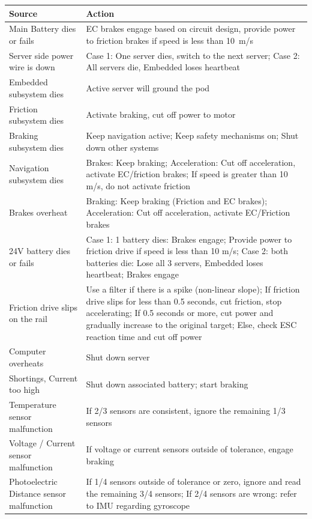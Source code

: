 \begin{table}[p]
\centering
\begin{tabular}{@{}p{3cm}p{13cm}@{}}
\toprule 
 Source & Action\\
\midrule
Main Battery dies or fails & EC brakes engage based on circuit design, provide power to friction brakes if speed is less than \SI{10}{m/s}\\
Server side power wire is down& Case 1: One server dies, switch to the next server; Case 2: All servers die, Embedded loses heartbeat\\
Embedded subsystem dies& Active server will ground the pod\\
Friction subsystem dies& Activate braking, cut off power to motor\\
Braking subsystem dies& Keep navigation active; Keep safety mechanisms on; Shut down other systems\\
Navigation subsystem dies& Brakes: Keep braking; Acceleration: Cut off acceleration, activate EC/friction brakes; If speed is greater than 10 m/s, do not activate friction\\
Brakes overheat& Braking: Keep braking (Friction and EC brakes); Acceleration: Cut off acceleration, activate EC/Friction brakes\\
24V battery dies or fails&Case 1: 1 battery dies: Brakes engage; Provide power to friction drive if speed is less than 10 m/s; Case 2: both batteries die:  Lose all 3 servers, Embedded loses heartbeat; Brakes engage\\
Friction drive slips on the rail&Use a filter if there is a spike (non-linear slope); If friction drive slips for less than 0.5 seconds, cut friction, stop accelerating; If 0.5 seconds or more, cut power and gradually increase to the original target; Else, check ESC reaction time and cut off power\\
Computer overheats & Shut down server\\
Shortings, Current too high & Shut down associated battery; start braking\\
Temperature sensor malfunction & If 2/3 sensors are consistent, ignore the remaining 1/3 sensors\\
Voltage / Current sensor malfunction& If voltage or current sensors outside of tolerance, engage braking\\
Photoelectric Distance sensor malfunction& If 1/4 sensors outside of tolerance or zero, ignore and read the remaining 3/4 sensors; If 2/4 sensors are wrong: refer to IMU regarding gyroscope\\

\end{tabular}
\end{table}
